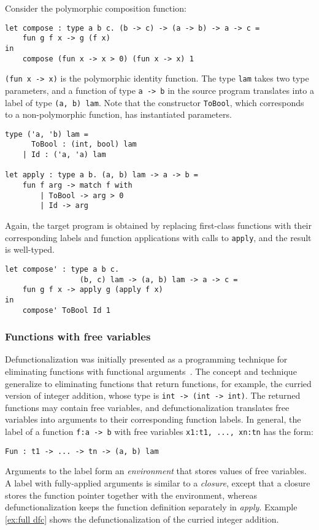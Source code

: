 \begin{exmp}
\label{ex:poly dfc}
Consider the polymorphic composition function:
\begin{lstlisting}
let compose : type a b c. (b -> c) -> (a -> b) -> a -> c =
    fun g f x -> g (f x) 
in
    compose (fun x -> x > 0) (fun x -> x) 1
\end{lstlisting}
\texttt{(fun x -> x)} is the polymorphic identity function. The type \texttt{lam} takes two type parameters, and a function of type \texttt{a -> b} in the source program translates into a label of type \texttt{(a, b) lam}. Note that the constructor \texttt{ToBool}, which corresponds to a non-polymorphic function, has instantiated parameters. 
\begin{lstlisting}
type ('a, 'b) lam = 
      ToBool : (int, bool) lam
    | Id : ('a, 'a) lam

let apply : type a b. (a, b) lam -> a -> b =
    fun f arg -> match f with
        | ToBool -> arg > 0
        | Id -> arg
\end{lstlisting}
Again, the target program is obtained by replacing first-class functions with their corresponding labels and function applications with calls to \texttt{apply}, and the result is well-typed.
\begin{lstlisting}
let compose' : type a b c. 
                 (b, c) lam -> (a, b) lam -> a -> c =
    fun g f x -> apply g (apply f x)
in 
    compose' ToBool Id 1
\end{lstlisting}
	
\end{exmp}

\subsubsection{Functions with free variables}
Defunctionalization was initially presented as a programming technique for eliminating functions with functional arguments~\cite{DBLP:conf/acm/Reynolds72}. The concept and technique generalize to eliminating functions that return functions, for example, the curried version of integer addition, whose type is \texttt{int -> (int -> int)}. The returned functions may contain free variables, and defunctionalization translates free variables into arguments to their corresponding function labels. In general, the label of a function \texttt{f:a -> b} with free variables \texttt{x1:t1, ..., xn:tn} has the form:
\begin{lstlisting}
Fun : t1 -> ... -> tn -> (a, b) lam
\end{lstlisting}
Arguments to the label form an \textit{environment} that stores values of free variables. A label with fully-applied arguments is similar to a \textit{closure}, except that a closure stores the function pointer together with the environment, whereas defunctionalization keeps the function definition separately in \textit{apply}. Example \ref{ex:full dfc} shows the defunctionalization of the curried integer addition.

